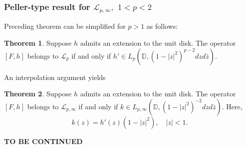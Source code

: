 \documentclass{beamer}
\theoremstyle{definition}
\newtheorem{thm}{Theorem}
\begin{document}
\begin{frame}
\frametitle{Peller-type result for $\mathcal{L}_{p,\infty},$ $1<p<2$}

Preceding theorem can be simplified for $p>1$ as follows:
\begin{thm} Suppose $h$ admits an extension to the unit disk. The operator $[F,h]$ belongs to $\mathcal{L}_p$ if and only if $h'\in L_p(\mathbb{D},(1-|z|^2)^{p-2}dzd\bar{z}).$
\end{thm}

An interpolation argument yields

\begin{thm} Suppose $h$ admits an extension to the unit disk. The operator $[F,h]$ belongs to $\mathcal{L}_{p,\infty}$ if and only if $k\in L_{p,\infty}(\mathbb{D},(1-|z|^2)^{-2}dzd\bar{z}).$ Here,
$$k(z)=h'(z)(1-|z|^2),\quad |z|<1.$$
\end{thm}
\end{frame}

\begin{frame}


{\bf\Huge TO BE CONTINUED}
\end{frame}
\end{document}
